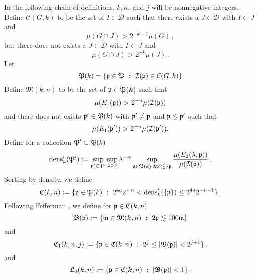 {In the following chain of definitions, $k, n$, and
$j$ will be nonnegative integers.
Define
$\mathcal{C}(G,k)$ to be the set of $I\in \mathcal{D}$
such that there exists a $J\in \mathcal{D}$ with $I\subset J$
and
\begin{equation}\label{muhj1}
   {\mu(G \cap J)} > 2^{-k-1}{\mu(G)}\, ,
\end{equation}
but there does not exists a $J\in \mathcal{D}$ with $I\subset J$ and
\begin{equation}\label{muhj2}
   {\mu(G \cap J)} > 2^{-k}{\mu(J)}\,.
\end{equation}
Let
\begin{equation}
    \label{eq defPk}
    \mathfrak P(k)=\{\mathfrak p\in \mathfrak P \ : \ \mathcal{I}(\mathfrak p)\in \mathcal{C}(G,k)\}
\end{equation}
Define $ {\mathfrak{M}}(k,n)$ to be the set of  $\mathfrak p \in \mathfrak P(k)$ such that
 \begin{equation}\label{ebardense}
    \mu({E_1}(\mathfrak p))  > 2^{-n}  \mu(\mathcal{I}(\mathfrak p))
 \end{equation}
and there does not exists $\mathfrak p'\in \mathfrak P(k)$ with
$\mathfrak p'\neq \mathfrak p$ and  $\mathfrak p\le \mathfrak p'$  such that
 \begin{equation}\label{mnkmax}
    \mu({E_1}(\mathfrak p'))  > 2^{-n}  \mu(\mathcal{I}(\mathfrak p')).
 \end{equation}
Define for a collection $\mathfrak P'\subset \mathfrak P(k)$
\begin{equation}
    \label{eq densdef}
   \operatorname{\operatorname{dens}}_k' (\mathfrak P'):= \sup_{\mathfrak p'\in \mathfrak P'}\sup_{\lambda \geq 2} \lambda^{-a} \sup_{\mathfrak p \in \mathfrak P(k): \lambda \mathfrak p' \lesssim \lambda \mathfrak p}
    \frac{\mu({E}_2(\lambda, \mathfrak p))}{\mu(\mathcal{I}(\mathfrak p))}\,.
\end{equation}
Sorting by density, we define
\begin{equation}
    \label{def cnk}
    \mathfrak C(k,n):=\{\mathfrak p\in \mathfrak P(k) \ : \
    2^{4a}2^{-n}< \operatorname{\operatorname{dens}}_k'(\{\mathfrak p\}) \le
    2^{4a}2^{-n+1}\}\,.
\end{equation}
Following Fefferman \cite{fefferman}, we
define for $\mathfrak p \in \mathfrak C(k,n)$
    \begin{equation}\label{defbfp}
         \mathfrak{B}(\mathfrak p) := \{ \mathfrak{m} \in \mathfrak{M}(k,n) \ : \ 2 \mathfrak p \lesssim 100 \mathfrak{m}\}
    \end{equation}
and
\begin{equation}\label{defcnkj}
       \mathfrak C_1(k,n,j) := \{\mathfrak p \in \mathfrak C(k,n) \ : \ 2^{j} \leq |\mathfrak{B}(\mathfrak p)| < 2^{j+1}\}\,.
\end{equation}
and
\begin{equation}\label{defl0nk}
       \fL_0(k,n) := \{\fp \in \fC(k,n) \ : \ |\mathfrak{B}(\fp)| <1\}\,.

\end{equation}}
